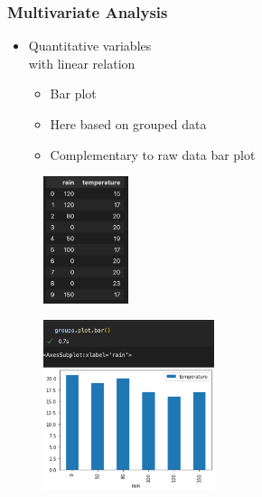 \begin{frame}\frametitle{Multivariate Analysis}
   \begin{minipage}{0.48\linewidth}
      \begin{itemize}
         \item Quantitative variables\\
               with linear relation
         \begin{itemize}
            \item Bar plot
            \item Here based on grouped data
            \item Complementary to raw data bar plot
         \end{itemize}
      \end{itemize}
      \begin{figure}[H]
         \includegraphics[width=2.5cm]{../images/illustrations/pattern_multivariate_quantitative_df.png}
      \end{figure}
   \end{minipage}
   \begin{minipage}{0.48\linewidth}
      \begin{figure}[H]
         \includegraphics[width=5cm]{../images/illustrations/pattern_multivariate_quantitative_bar_grouped.png}
      \end{figure}
   \end{minipage}
\end{frame}




